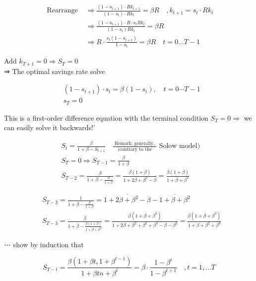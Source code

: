\documentclass[10pt]{article}
\begin{document}
$$
\begin{aligned}
\text { Rearrange } & \Rightarrow \frac{\left(1-s_{t+1}\right) \cdot R k_{t+1}}{\left(1-s_{t}\right) \cdot R k_{t}}=\beta R \quad, k_{t+1}=s_{t} \cdot R k_{t} \\
& \Rightarrow \frac{\left(1-s_{t+1}\right) \cdot R \cdot s_{t} R k_{t}}{\left(1-s_{t}\right) R k_{t}}=\beta R \\
& \Rightarrow R \cdot \frac{s_{t}\left(1-s_{t+1}\right)}{1-s_{t}}=\beta R \quad t=0 \ldots T-1
\end{aligned}
$$

Add $k_{T+1}=0 \Rightarrow S_{T}=0$\\
⇒ The optimal savings rate solve

$$
\begin{aligned}
& \left(1-s_{t+1}\right) \cdot s_{t}=\beta\left(1-s_{t}\right), \quad t=0 \cdots T-1 \\
& s_{T}=0
\end{aligned}
$$

This is a first-order difference equation with the terminal condition $S_{T}=0 \Rightarrow$ we can easily solve it backwards!'

$$
\begin{aligned}
& S_{t}=\frac{\beta}{1+\beta-S_{t+1}} \quad \frac{\text { Remark: generally, }}{\text { (contrary to the }} \text { Solow model) } \\
& S_{T}=0 \Rightarrow S_{T-1}=\frac{\beta}{1+\beta} \\
& S_{T-2}=\frac{\beta}{1+\beta-\frac{\beta}{1+\beta}}=\frac{\beta(1+\beta)}{1+2 \beta+\beta^{2}-\beta}=\frac{\beta(1+\beta)}{1+\beta+\beta^{2}}
\end{aligned}
$$

$$
\begin{aligned}
& S_{T-2}=\frac{1}{1+\beta-\frac{\beta}{1+\beta}}=\overline{1+2 \beta+\beta^{2}-\beta}-\overline{1+\beta+\beta^{2}} \\
& S_{T-3}=\frac{\beta}{1+\beta-\frac{\beta(1+\beta)}{1+\beta+\beta^{2}}}=\frac{\beta\left(1+\beta+\beta^{2}\right)}{1+2 \beta+\beta^{2}+\beta^{2}+\beta^{3}-\beta-\beta^{2}}=\frac{\beta\left(1+\beta+\beta^{2}\right)}{1+\beta+\beta^{2}+\beta^{3}}
\end{aligned}
$$

⋯ show by induction that

$$
S_{T-t}=\frac{\beta\left(1+\beta t, 1+\beta^{t-1}\right)}{1+\beta t n+\beta^{t}}=\beta \cdot \frac{1-\beta^{t}}{1-\beta^{t+1}} \quad, t=1, \ldots T
$$
\end{document}

